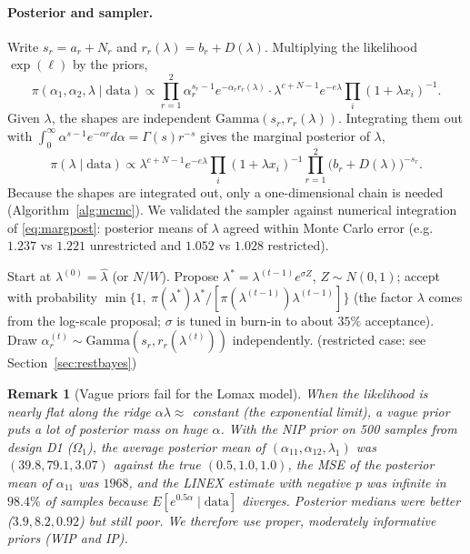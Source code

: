 \documentclass[a4paper,11pt]{article}
\newtheorem{remark}{Remark}[section]
\begin{document}
\paragraph{Posterior and sampler.} Write $s_r=a_r+N_r$ and $r_r(\lambda)=b_r+D(\lambda)$. Multiplying the likelihood $\exp(\ell)$ by the priors,
\[
\pi(\alpha_1,\alpha_2,\lambda\mid\text{data})\propto\prod_{r=1}^2\alpha_r^{s_r-1}e^{-\alpha_rr_r(\lambda)}\cdot\lambda^{c+N-1}e^{-e\lambda}\prod_{i}(1+\lambda x_i)^{-1}.
\]
Given $\lambda$, the shapes are independent $\mathrm{Gamma}(s_r,r_r(\lambda))$. Integrating them out with $\int_0^\infty\alpha^{s-1}e^{-\alpha r}d\alpha=\Gamma(s)r^{-s}$ gives the marginal posterior of $\lambda$,
\begin{equation}\label{eq:margpost}
\pi(\lambda\mid\text{data})\propto\lambda^{c+N-1}e^{-e\lambda}\prod_i(1+\lambda x_i)^{-1}\prod_{r=1}^{2}\big(b_r+D(\lambda)\big)^{-s_r}.
\end{equation}
Because the shapes are integrated out, only a one-dimensional chain is needed (Algorithm~\ref{alg:mcmc}). We validated the sampler against numerical integration of \eqref{eq:margpost}: posterior means of $\lambda$ agreed within Monte Carlo error (e.g.\ $1.237$ vs $1.221$ unrestricted and $1.052$ vs $1.028$ restricted).

\begin{algorithm}[htbp]
\caption{Collapsed Metropolis--Gibbs sampler}\label{alg:mcmc}
\begin{algorithmic}[1]
\STATE Start at $\lambda^{(0)}=\hat\lambda$ (or $N/W$).
\STATE Propose $\lambda^*=\lambda^{(t-1)}e^{\sigma Z}$, $Z\sim N(0,1)$; accept with probability $\min\{1,\ \pi(\lambda^*)\lambda^*/[\pi(\lambda^{(t-1)})\lambda^{(t-1)}]\}$ (the factor $\lambda$ comes from the log-scale proposal; $\sigma$ is tuned in burn-in to about $35\%$ acceptance).
\STATE Draw $\alpha_r^{(t)}\sim\mathrm{Gamma}(s_r,r_r(\lambda^{(t)}))$ independently. \hfill (restricted case: see Section~\ref{sec:restbayes})
\ENDFOR
\end{algorithmic}
\end{algorithm}

\begin{remark}[Vague priors fail for the Lomax model]\label{rem:nip}
When the likelihood is nearly flat along the ridge $\alpha\lambda\approx$ constant (the exponential limit), a vague prior puts a lot of posterior mass on huge $\alpha$. With the NIP prior on 500 samples from design D1 ($\Omega_1$), the average posterior mean of $(\alpha_{11},\alpha_{12},\lambda_1)$ was $(39.8,79.1,3.07)$ against the true $(0.5,1.0,1.0)$, the MSE of the posterior mean of $\alpha_{11}$ was $1968$, and the LINEX estimate with negative $p$ was infinite in $98.4\%$ of samples because $E[e^{0.5\alpha}\mid\text{data}]$ diverges. Posterior medians were better ($3.9,8.2,0.92$) but still poor. We therefore use proper, moderately informative priors (WIP and IP).
\end{remark}
\end{document}
